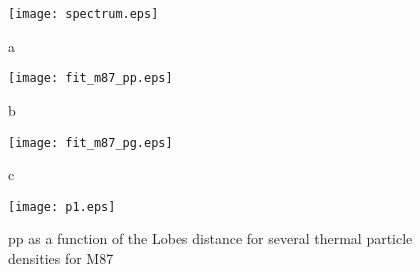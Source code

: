 \documentclass[preprint, twocolumn,secnumarabic,amssymb, nobibnotes, aps, prd]{revtex4-1}
\begin{document}
\begin{figure}[!htb] 
\centering
\texttt{[image: spectrum.eps]}\\
\caption{a}\label{SED}
\end{figure} 




\begin{figure}[!htb]  
\centering
\texttt{[image: fit\_m87\_pp.eps]}\\
  \caption{b}\label{SEDpp}
\end{figure} 



\begin{figure}[!htb]  
\centering
\texttt{[image: fit\_m87\_pg.eps]}\\
\caption{c}\label{SEDpg}
\end{figure} 




\begin{figure}[!htb] 
\centering
\texttt{[image: p1.eps]}\\
\caption{pp as a function of the Lobes distance for several  thermal particle densities for  M87}
\label{optdep}
\end{figure}







{}
\begin{large}

\end{large}
\mbox{}
\end{document}
